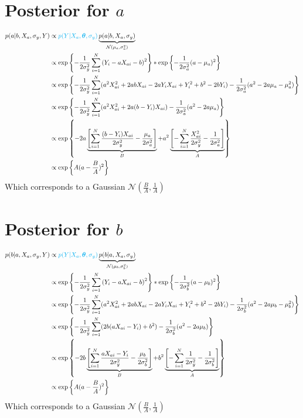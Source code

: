 \documentclass[10pt]{article}
\renewcommand{\vec}[1]{\boldsymbol{#1}}
\begin{document}
    
    \section{Posterior for $a$}
    \begin{align}
        p(a|b, X_a, \sigma_y, Y) &\propto {\color{cyan} p(Y | X_a, \vec{\theta}, \sigma_y)} \underbrace{p(a | b, X_a, \sigma_{y})}_{\mathcal{N}(\mu_a, \sigma_a^2)} \\
        &\propto \exp\left\{ - \frac{1}{2\sigma_y^2} \sum_{i=1}^N \left( Y_i - a X_{ai} - b \right)^2 \right\} * \exp\left\{ - \frac{1}{2\sigma_a^2} ( a - \mu_a )^2 \right\} \\
        &\propto \exp\left\{ - \frac{1}{2\sigma_y^2} \sum_{i=1}^N (a^2 X_{ai}^2  + 2 a b X_{ai} - 2 a Y_i X_{ai} + Y_i^2 + b^2 -2 b Y_i) - \frac{1}{2\sigma_a^2} ( a^2 - 2 a \mu_a - \mu_a^2 ) \right\} \\
        &\propto \exp\left\{ - \frac{1}{2\sigma_y^2} \sum_{i=1}^N (a^2 X_{ai}^2  + 2 a (b - Y_i) X_{ai} ) - \frac{1}{2\sigma_a^2} ( a^2 - 2 a \mu_a ) \right\} \\
        &\propto \exp\left\{ - 2 a \underbrace{\left[ \sum_{i=1}^N \frac{(b - Y_i) X_{ai}}{2\sigma_y^2} - \frac{\mu_a}{2\sigma_a^2} \right]}_{B} + a^2 \underbrace{\left[ - \sum_{i=1}^N \frac{X_{ai}^2}{2\sigma_y^2}  - \frac{1}{2\sigma_a^2} \right]}_{A} \right\} \\
        &\propto \exp\left\{ A (a - \frac{B}{A})^2\right\}
    \end{align}
    Which corresponds to a Gaussian $\mathcal{N}(\frac{B}{A}, \frac{1}{A})$
    
    
    \section{Posterior for $b$}
    \begin{align}
        p(b|a, X_a, \sigma_y, Y) &\propto {\color{cyan} p(Y | X_a, \vec{\theta}, \sigma_y)} \underbrace{p(b | a, X_a, \sigma_{y})}_{\mathcal{N}(\mu_b, \sigma_b^2)} \\
        &\propto \exp\left\{ - \frac{1}{2\sigma_y^2} \sum_{i=1}^N \left( Y_i - a X_{ai} - b \right)^2 \right\} * \exp\left\{ - \frac{1}{2\sigma_b^2} ( a - \mu_b )^2 \right\} \\
        &\propto \exp\left\{ - \frac{1}{2\sigma_y^2} \sum_{i=1}^N (a^2 X_{ai}^2  + 2 a b X_{ai} - 2 a Y_i X_{ai} + Y_i^2 + b^2 -2 b Y_i )- \frac{1}{2\sigma_b^2} ( a^2 - 2 a \mu_b - \mu_b^2 ) \right\} \\
        &\propto \exp\left\{ - \frac{1}{2\sigma_y^2} \sum_{i=1}^N (2 b (a X_{ai} - Y_i) + b^2 ) - \frac{1}{2\sigma_b^2} ( a^2 - 2 a \mu_b ) \right\} \\
        &\propto \exp\left\{ - 2 b \underbrace{\left[ \sum_{i=1}^N \frac{a X_{ai} - Y_i}{2\sigma_y^2} - \frac{\mu_b}{2\sigma_b^2} \right]}_{B} + b^2 \underbrace{\left[ - \sum_{i=1}^N \frac{1}{2\sigma_y^2}  - \frac{1}{2\sigma_b^2} \right]}_{A} \right\} \\
        &\propto \exp\left\{A (a - \frac{B}{A})^2\right\}
    \end{align}
    Which corresponds to a Gaussian $\mathcal{N}(\frac{B}{A}, \frac{1}{A})$
    
\end{document}

